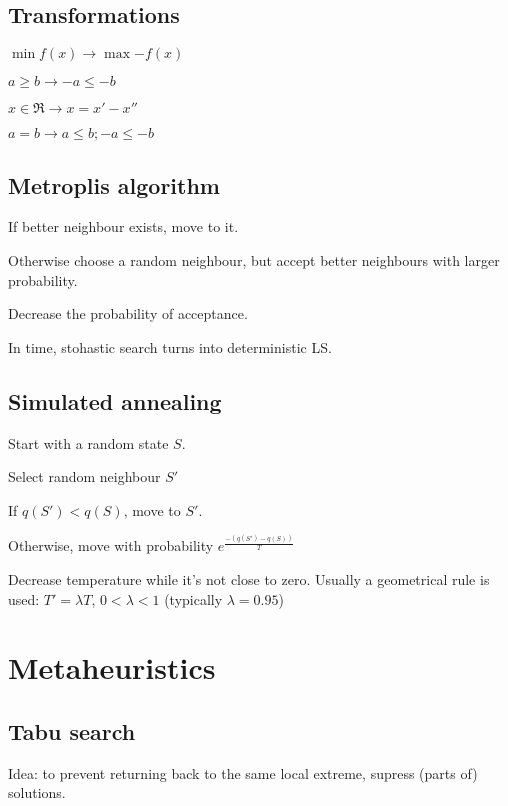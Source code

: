 \documentclass{article}
\begin{document}
\begin{multicols*}{2}
{\subsection{Transformations}
\begin{compactitem}
	\item $\min{f(x)} \rightarrow \max{-f(x)}$
	\item $a \geq b \rightarrow -a \leq -b$
	\item $x \in \Re \rightarrow x = x' - x''$
	\item $a = b \rightarrow a \leq b; -a \leq -b$
\end{compactitem}

\subsection{Metroplis algorithm}
\begin{compactitem}
	\item If better neighbour exists, move to it.
	\item Otherwise choose a random neighbour, but accept better neighbours with larger probability.
	\item Decrease the probability of acceptance.
	\item In time, stohastic search turns into deterministic LS.
\end{compactitem}
\subsection{Simulated annealing}
\begin{compactitem}
	\item Start with a random state $S$.
	\item Select random neighbour $S\prime$
	\item If $q(S\prime) < q(S)$, move to $S\prime$.
	\item Otherwise, move with probability $e^\frac{-(q(S\prime)-q(S))}{T}$
\end{compactitem}
Decrease temperature while it's not close to zero.
Usually a geometrical rule is used: $T\prime = \lambda T$, $0<\lambda<1$ (typically $\lambda = 0.95$)
\section{Metaheuristics}
\subsection{Tabu search}
Idea: to prevent returning back to the same local extreme, supress (parts of) solutions.
}
\end{multicols*}
\end{document}
